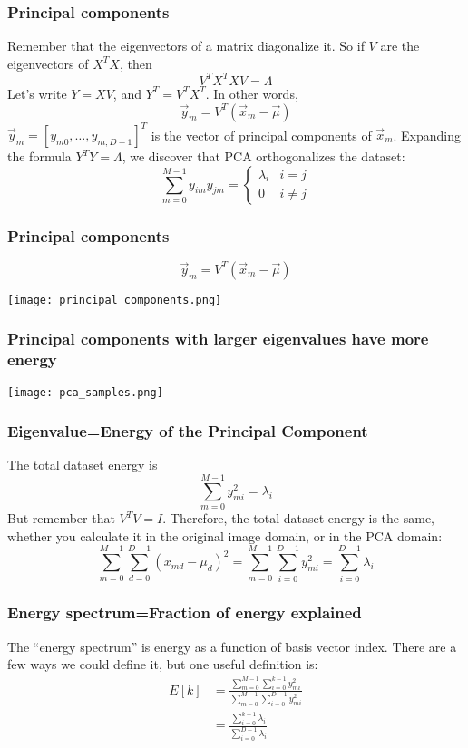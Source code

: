 \documentclass{beamer}
\begin{document}
\begin{frame}
  \frametitle{Principal components}
  Remember that the eigenvectors of a matrix diagonalize it.
  So if $V$ are the eigenvectors of $X^TX$, then
  \[
  V^TX^TXV=\Lambda
  \]
  Let's write $Y=XV$, and $Y^T=V^TX^T$.  In other words,
  \[
  \vec{y}_m=V^T(\vec{x}_m-\vec\mu)
  \]
  $\vec{y}_m=[y_{m0},\ldots,y_{m,D-1}]^T$ is the vector of
  principal components of $\vec{x}_m$.  Expanding the formula
  $Y^TY=\Lambda$, we discover that PCA orthogonalizes the dataset:
  \[
  \sum_{m=0}^{M-1}y_{im}y_{jm}=\begin{cases}
  \lambda_i & i=j\\0&i\ne j
  \end{cases}
  \]
\end{frame}

\begin{frame}
  \frametitle{Principal components}
  \[
  \vec{y}_m=V^T(\vec{x}_m-\vec\mu)
  \]
  \centerline{\texttt{[image: principal\_components.png]}}
\end{frame}

\begin{frame}
  \frametitle{Principal components with larger eigenvalues have more energy}
  \centerline{\texttt{[image: pca\_samples.png]}}
\end{frame}

\begin{frame}
  \frametitle{Eigenvalue=Energy of the Principal Component}
  The total dataset energy is
  \[
  \sum_{m=0}^{M-1}y_{mi}^2=\lambda_i
  \]
  But remember that $V^TV=I$.  Therefore, the total dataset energy
  is the same, whether you calculate it in the original image
  domain, or in the PCA domain:
  \[
  \sum_{m=0}^{M-1}\sum_{d=0}^{D-1}(x_{md}-\mu_d)^2
  =\sum_{m=0}^{M-1}\sum_{i=0}^{D-1}y_{mi}^2=\sum_{i=0}^{D-1}\lambda_i
  \]
\end{frame}

\begin{frame}
  \frametitle{Energy  spectrum=Fraction of energy explained}
  The ``energy spectrum'' is energy as a function of
  basis vector index.  There are a few ways we could define it,
  but one useful definition is:
  \begin{align*}
    E[k] &=\frac{\sum_{m=0}^{M-1}\sum_{i=0}^{k-1}y_{mi}^2}
    {\sum_{m=0}^{M-1}\sum_{i=0}^{D-1}y_{mi}^2}\\
    &=\frac{\sum_{i=0}^{k-1}\lambda_i}{\sum_{i=0}^{D-1}\lambda_i}
  \end{align*}
\end{frame}
\end{document}
